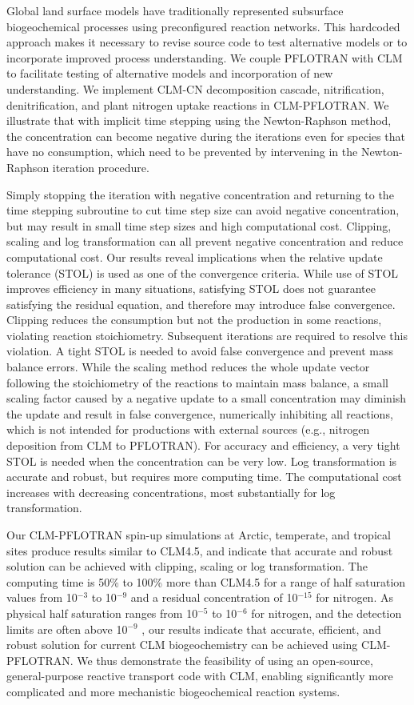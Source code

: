 \documentclass[gmd, manuscript]{copernicus}
\begin{document}
%
Global land surface models have traditionally represented subsurface
biogeochemical processes using preconfigured reaction networks. This hardcoded
approach makes it necessary to revise source code to test alternative models or
to incorporate improved process understanding. We couple PFLOTRAN with CLM to
facilitate testing of alternative models and incorporation of new
understanding. We implement CLM-CN decomposition cascade, nitrification,
denitrification, and plant nitrogen uptake reactions in CLM-PFLOTRAN. We
illustrate that with implicit time stepping using the Newton-Raphson method, 
the concentration can become
negative during the iterations even for species that have no consumption, which
need to be prevented by intervening in the Newton-Raphson iteration procedure. 

Simply stopping the iteration with negative concentration and returning to the
time stepping subroutine to cut time step size can avoid negative
concentration, but may result in small time step sizes and high computational
cost. Clipping, scaling  and log transformation can all prevent negative
concentration and reduce computational cost. Our results reveal implications
when the relative update tolerance (STOL) is used as one of the convergence criteria. 
While use of STOL improves efficiency in many situations, satisfying STOL does
not guarantee satisfying the residual equation, and therefore may introduce
false convergence. Clipping reduces the consumption but not the production in
some reactions, violating reaction stoichiometry. Subsequent iterations are
required to resolve this violation. A tight STOL is needed to avoid false
convergence and prevent mass balance errors. While the scaling method reduces
the whole update vector following the stoichiometry of the reactions to maintain  
mass balance, a small scaling factor caused by a negative update to a small
concentration may diminish the update and result in false convergence,
numerically inhibiting all reactions, which is not intended for productions
with external sources (e.g., nitrogen deposition from CLM to PFLOTRAN). For
accuracy and efficiency, a very tight STOL is needed when the concentration can
be very low. Log transformation is accurate and robust, but requires more
computing time. The computational cost increases with decreasing
concentrations, most substantially for log transformation.

Our CLM-PFLOTRAN spin-up simulations at Arctic, temperate, and tropical sites
produce results similar to CLM4.5, and indicate that accurate and robust
solution can be achieved with clipping, scaling or log transformation. The
computing time is 50\% to 100\% more than CLM4.5 for a range of half
saturation values from 10$^{-3}$ to 10$^{-9}$ and a residual concentration of
10$^{-15}$ for nitrogen. As physical half saturation ranges from 10$^{-5}$ to
10$^{-6}$  for nitrogen, and the detection limits are often above
10$^{-9}$ , our results indicate that accurate, efficient, and robust
solution  for current CLM biogeochemistry can be achieved using CLM-PFLOTRAN.
We thus demonstrate the feasibility of using an open-source, general-purpose
reactive transport code with CLM, enabling significantly more complicated and
more mechanistic biogeochemical reaction systems. 
 
\end{document}

